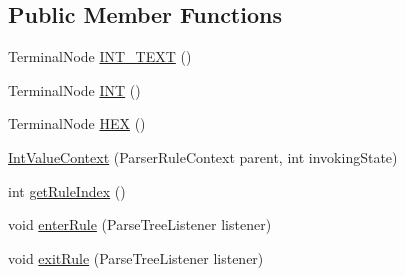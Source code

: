\subsection*{Public Member Functions}
\begin{DoxyCompactItemize}
\item 
Terminal\+Node \hyperlink{classgov_1_1nasa_1_1jpf_1_1inspector_1_1server_1_1expression_1_1parser_1_1_expression_grammar_parser_1_1_int_value_context_a54588a3c0ca257fd613a84a57c7fd41e}{I\+N\+T\+\_\+\+T\+E\+XT} ()
\item 
Terminal\+Node \hyperlink{classgov_1_1nasa_1_1jpf_1_1inspector_1_1server_1_1expression_1_1parser_1_1_expression_grammar_parser_1_1_int_value_context_a99e81af2b18d2f4a93fcca48c93000f4}{I\+NT} ()
\item 
Terminal\+Node \hyperlink{classgov_1_1nasa_1_1jpf_1_1inspector_1_1server_1_1expression_1_1parser_1_1_expression_grammar_parser_1_1_int_value_context_ad750fb1734b21adf75a2309c193a8abd}{H\+EX} ()
\item 
\hyperlink{classgov_1_1nasa_1_1jpf_1_1inspector_1_1server_1_1expression_1_1parser_1_1_expression_grammar_parser_1_1_int_value_context_aa969e2bf7ba4130d5e08148a09be981b}{Int\+Value\+Context} (Parser\+Rule\+Context parent, int invoking\+State)
\item 
int \hyperlink{classgov_1_1nasa_1_1jpf_1_1inspector_1_1server_1_1expression_1_1parser_1_1_expression_grammar_parser_1_1_int_value_context_a106bfaef1f8b687a6e1c9a52d0b49eeb}{get\+Rule\+Index} ()
\item 
void \hyperlink{classgov_1_1nasa_1_1jpf_1_1inspector_1_1server_1_1expression_1_1parser_1_1_expression_grammar_parser_1_1_int_value_context_a9cb42a92efbcd48688b5491a19fa0a10}{enter\+Rule} (Parse\+Tree\+Listener listener)
\item 
void \hyperlink{classgov_1_1nasa_1_1jpf_1_1inspector_1_1server_1_1expression_1_1parser_1_1_expression_grammar_parser_1_1_int_value_context_a7b24d39e1103dff330e8ddd3e0e5740a}{exit\+Rule} (Parse\+Tree\+Listener listener)
\end{DoxyCompactItemize}
